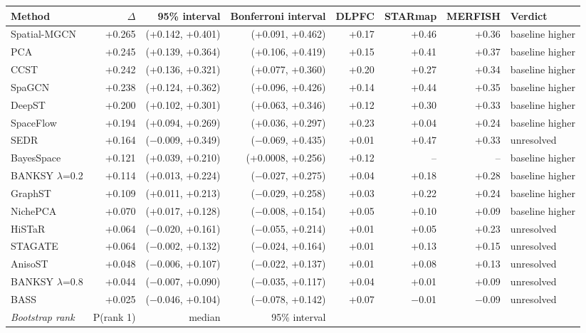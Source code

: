 \scriptsize
\begin{tabular}{lrrrrrrl}
\toprule
Method & $\Delta$ & 95\% interval & Bonferroni interval & DLPFC & STARmap & MERFISH & Verdict \\
\midrule
Spatial-MGCN & +0.265 & (+0.142, +0.401) & (+0.091, +0.462) & +0.17 & +0.46 & +0.36 & baseline higher \\
PCA & +0.245 & (+0.139, +0.364) & (+0.106, +0.419) & +0.15 & +0.41 & +0.37 & baseline higher \\
CCST & +0.242 & (+0.136, +0.321) & (+0.077, +0.360) & +0.20 & +0.27 & +0.34 & baseline higher \\
SpaGCN & +0.238 & (+0.124, +0.362) & (+0.096, +0.426) & +0.14 & +0.44 & +0.35 & baseline higher \\
DeepST & +0.200 & (+0.102, +0.301) & (+0.063, +0.346) & +0.12 & +0.30 & +0.33 & baseline higher \\
SpaceFlow & +0.194 & (+0.094, +0.269) & (+0.036, +0.297) & +0.23 & +0.04 & +0.24 & baseline higher \\
SEDR & +0.164 & ($-$0.009, +0.349) & ($-$0.069, +0.435) & +0.01 & +0.47 & +0.33 & unresolved \\
BayesSpace & +0.121 & (+0.039, +0.210) & (+0.0008, +0.256) & +0.12 & -- & -- & baseline higher \\
BANKSY $\lambda$=0.2 & +0.114 & (+0.013, +0.224) & ($-$0.027, +0.275) & +0.04 & +0.18 & +0.28 & baseline higher \\
GraphST & +0.109 & (+0.011, +0.213) & ($-$0.029, +0.258) & +0.03 & +0.22 & +0.24 & baseline higher \\
NichePCA & +0.070 & (+0.017, +0.128) & ($-$0.008, +0.154) & +0.05 & +0.10 & +0.09 & baseline higher \\
HiSTaR & +0.064 & ($-$0.020, +0.161) & ($-$0.055, +0.214) & +0.01 & +0.05 & +0.23 & unresolved \\
STAGATE & +0.064 & ($-$0.002, +0.132) & ($-$0.024, +0.164) & +0.01 & +0.13 & +0.15 & unresolved \\
AnisoST & +0.048 & ($-$0.006, +0.107) & ($-$0.022, +0.137) & +0.01 & +0.08 & +0.13 & unresolved \\
BANKSY $\lambda$=0.8 & +0.044 & ($-$0.007, +0.090) & ($-$0.035, +0.117) & +0.04 & +0.01 & +0.09 & unresolved \\
BASS & +0.025 & ($-$0.046, +0.104) & ($-$0.078, +0.142) & +0.07 & $-$0.01 & $-$0.09 & unresolved \\
\midrule
\emph{Bootstrap rank} & P(rank 1) & median & 95\% interval &  &  &  &  \\

\end{tabular}
